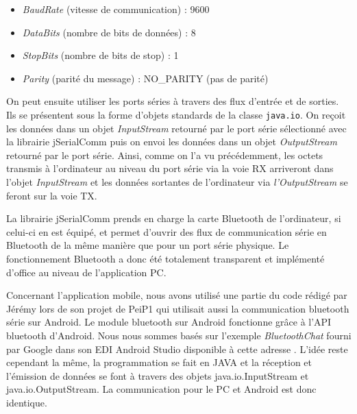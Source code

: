 \documentclass{polytech/polytech}
\begin{document}

\begin{itemize}
\item \textit{BaudRate} (vitesse de communication) : 9600
\item \textit{DataBits} (nombre de bits de données) : 8
\item \textit{StopBits} (nombre de bits de stop) : 1
\item \textit{Parity} (parité du message) : NO\_PARITY (pas de parité)
\end{itemize}

On peut ensuite utiliser les ports séries à travers des flux d'entrée et de sorties. Ils se présentent sous la forme d'objets standards de la classe \texttt{java.io}. On reçoit les données dans un objet \textit{InputStream} retourné par le port série sélectionné avec la librairie jSerialComm puis on envoi les données dans un objet \textit{OutputStream} retourné par le port série. Ainsi, comme on l'a vu précédemment, les octets transmis à l'ordinateur au niveau du port série via la voie RX arriveront dans l'objet \textit{InputStream} et les données sortantes de l'ordinateur via \textit{l'OutputStream} se feront sur la voie TX.

La librairie jSerialComm prends en charge la carte Bluetooth de l'ordinateur, si celui-ci en est équipé, et permet d'ouvrir des flux de communication série en Bluetooth de la même manière que pour un port série physique. Le fonctionnement Bluetooth a donc été totalement transparent et implémenté d'office au niveau de l'application PC.

Concernant l'application mobile, nous avons utilisé une partie du code rédigé par Jérémy lors de son projet de PeiP1 qui utilisait aussi la communication bluetooth série sur Android.
 Le module bluetooth sur Android fonctionne grâce à l'API bluetooth  d'Android. 
Nous nous sommes basés sur l'exemple \textit{BluetoothChat} fourni par Google dans son EDI Android Studio disponible à cette adresse \cite{android_studio}. L'idée reste cependant la même, la programmation se fait en JAVA et la réception et l'émission de données se font à travers des objets java.io.InputStream et java.io.OutputStream. 
La communication pour le PC et Android est donc identique.

\end{document}
